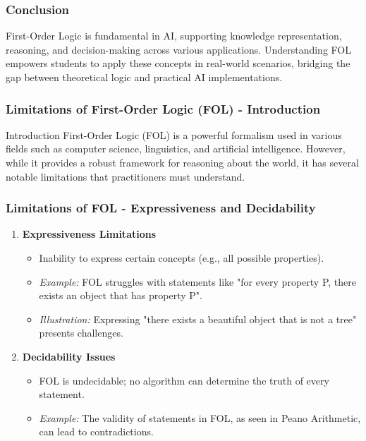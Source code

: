 \documentclass[aspectratio=169]{beamer}
\begin{document}
\begin{frame}[fragile]
    \frametitle{Conclusion}
    First-Order Logic is fundamental in AI, supporting knowledge representation, reasoning, and decision-making across various applications. Understanding FOL empowers students to apply these concepts in real-world scenarios, bridging the gap between theoretical logic and practical AI implementations.
\end{frame}

\begin{frame}[fragile]
    \frametitle{Limitations of First-Order Logic (FOL) - Introduction}
    \begin{block}{Introduction}
        First-Order Logic (FOL) is a powerful formalism used in various fields such as computer science, linguistics, and artificial intelligence. However, while it provides a robust framework for reasoning about the world, it has several notable limitations that practitioners must understand.
    \end{block}
\end{frame}

\begin{frame}[fragile]
    \frametitle{Limitations of FOL - Expressiveness and Decidability}
    \begin{enumerate}
        \item \textbf{Expressiveness Limitations}
        \begin{itemize}
            \item Inability to express certain concepts (e.g., all possible properties).
            \item \textit{Example:} FOL struggles with statements like "for every property P, there exists an object that has property P".
            \item \textit{Illustration:} Expressing "there exists a beautiful object that is not a tree" presents challenges.
        \end{itemize}
        
        \item \textbf{Decidability Issues}
        \begin{itemize}
            \item FOL is undecidable; no algorithm can determine the truth of every statement.
            \item \textit{Example:} The validity of statements in FOL, as seen in Peano Arithmetic, can lead to contradictions.
        \end{itemize}
    \end{enumerate}
\end{frame}
\end{document}
